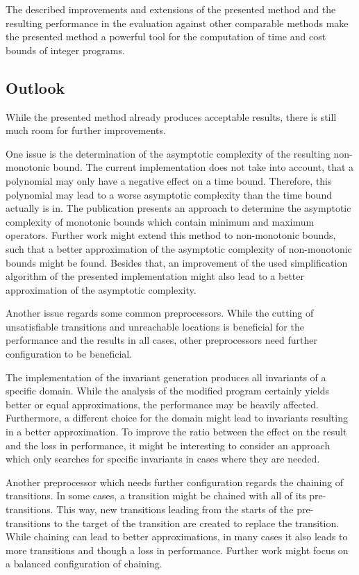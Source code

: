 The described improvements and extensions of the presented method and the resulting performance in the evaluation against other comparable methods make the presented method a powerful tool for the computation of time and cost bounds of integer programs.

\subsection{Outlook}

While the presented method already produces acceptable results, there is still much room for further improvements.

One issue is the determination of the asymptotic complexity of the resulting non-monotonic bound.
The current implementation does not take into account, that a polynomial may only have a negative effect on a time bound.
Therefore, this polynomial may lead to a worse asymptotic complexity than the time bound actually is in.
The publication \cite{albert2009asymptotic} presents an approach to determine the asymptotic complexity of monotonic bounds which contain minimum and maximum operators.
Further work might extend this method to non-monotonic bounds, such that a better approximation of the asymptotic complexity of non-monotonic bounds might be found.
Besides that, an improvement of the used simplification algorithm of the presented implementation might also lead to a better approximation of the asymptotic complexity.

Another issue regards some common preprocessors.
While the cutting of unsatisfiable transitions and unreachable locations is beneficial for the performance and the results in all cases, other preprocessors need further configuration to be beneficial.

The implementation of the invariant generation produces all invariants of a specific domain.
While the analysis of the modified program certainly yields better or equal approximations, the performance may be heavily affected.
Furthermore, a different choice for the domain might lead to invariants resulting in a better approximation.
To improve the ratio between the effect on the result and the loss in performance, it might be interesting to consider an approach which only searches for specific invariants in cases where they are needed.

Another preprocessor which needs further configuration regards the chaining of transitions.
In some cases, a transition might be chained with all of its pre-transitions.
This way, new transitions leading from the starts of the pre-transitions to the target of the transition are created to replace the transition.
While chaining can lead to better approximations, in many cases it also leads to more transitions and though a loss in performance.
Further work might focus on a balanced configuration of chaining.

